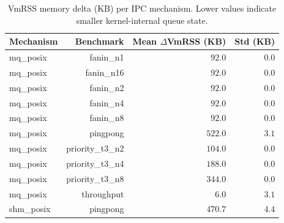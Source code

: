 \begin{table}[!t]
\centering
\caption{VmRSS memory delta (KB) per IPC mechanism. Lower values indicate smaller kernel-internal queue state.}
\label{tab:memory_footprint}
\begin{tabular}{lrrr}
\toprule
\textbf{Mechanism} & \textbf{Benchmark} & \textbf{Mean $\Delta$VmRSS (KB)} & \textbf{Std (KB)} \\
\midrule
mq_posix & fanin_n1 & $92.0$ & $0.0$ \\
mq_posix & fanin_n16 & $92.0$ & $0.0$ \\
mq_posix & fanin_n2 & $92.0$ & $0.0$ \\
mq_posix & fanin_n4 & $92.0$ & $0.0$ \\
mq_posix & fanin_n8 & $92.0$ & $0.0$ \\
mq_posix & pingpong & $522.0$ & $3.1$ \\
mq_posix & priority_t3_n2 & $104.0$ & $0.0$ \\
mq_posix & priority_t3_n4 & $188.0$ & $0.0$ \\
mq_posix & priority_t3_n8 & $344.0$ & $0.0$ \\
mq_posix & throughput & $6.0$ & $3.1$ \\
shm_posix & pingpong & $470.7$ & $4.4$ \\
\bottomrule
\end{tabular}
\end{table}
